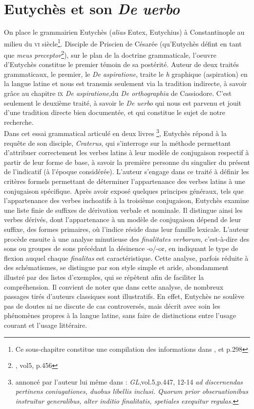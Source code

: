 \documentclass[a4paper, twoside, 12pt]{book}
\begin{document}
\section{Eutychès  et son \textit{De uerbo}}

On place le grammairien Eutychès (\textit{alias} Eutex, Eutychius) à Constantinople au milieu du \textsc{vi}\ieme{} siècle\footnote{ Ce sous-chapitre constitue une compilation des informations dans \cite{lomanto1985Eutiche}, \cite{conduche2019miseenpage} et \cite{zetzel2018critics}p.298}. Disciple de Priscien de Césarée (qu'Eutychès défint en tant que \textit{meus preceptor}\footnote{\cite{keil1857grammatici}, vol5, p.456}), sur le plan de la doctrine grammaticale,  l'oeuvre d'Eutychès constitue le premier témoin de sa postérité. Auteur de deux traités grammaticaux, le premier, le \textit{De aspiratione}, traite le \textit{h} graphique (aspiration) en la langue latine et nous est transmis seulement via la tradition indirecte, à savoir grâce au chapitre  \textsc{ix} \textit{De aspiratione},du \textit{De orthographia} de Cassiodore. C'est seulement le deuxième traité, à savoir le \textit{De uerbo} qui nous est parvenu et jouit d'une tradition directe bien documentée, et qui constitue le sujet de notre recherche.\\

Dans cet essai grammatical articulé en deux livres \footnote{annoncé par l'auteur lui même dans : \textit{GL},vol.5,p.447, 12-14 \textit{ad discernendas pertinens coniugationes, duobus libellis inclusi. Quorum prior obseruationibus instruitur generalibus, alter inditio finalitatis, spetiales exequitur regulas.}}, Eutychès répond à la requête de son disciple, \textit{Craterus}, qui s'interroge sur la méthode permettant d'attribuer correctement les verbes latins à leur modèle de conjugaison respectif à partir de leur forme de base, à savoir la première personne du singulier du présent de l'indicatif (à l'époque considérée). L'auteur s'engage dans ce traité à définir les critères formels permettant de déterminer l'appartenance des verbes latins à une conjugaison spécifique. Après avoir exposé quelques principes généraux, tels que l'appartenance des verbes inchoatifs à la troisième conjugaison, Eutychès examine une liste finie de suffixes de dérivation verbale et nominale. Il distingue ainsi les verbes dérivés, dont l'appartenance à un modèle de conjugaison dépend de leur suffixe, des formes primaires, où l'indice réside dans leur famille lexicale. L'auteur procède ensuite à une analyse minutieuse des \textit{finalitates verborum}, c'est-à-dire des sons ou groupes de sons précédant la désinence -o/-or, en indiquant le type de flexion auquel chaque \textit{finalitas} est caractéristique. Cette analyse, parfois réduite à des schématismes, se distingue par son style simple et aride, abondamment illustré par des listes d'exemples, qui se répètent afin de faciliter la compréhension. Il convient de noter que dans cette analyse, de nombreux passages tirés d'auteurs classiques sont illustratifs. En effet, Eutychès ne soulève pas de doutes ni ne discute de cas controversés, mais décrit avec soin les phénomènes propres à la langue latine, sans faire de distinctions entre l'usage courant et l'usage littéraire.\\
\end{document}

